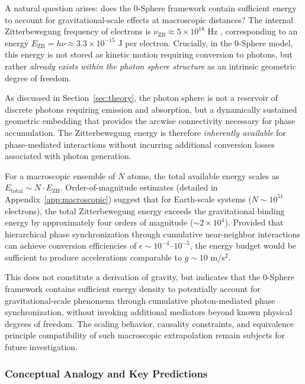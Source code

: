 \documentclass[
 reprint,
 amsmath,amssymb,
 aps,
 prb,
]{revtex4-2}
\numberwithin{equation}{section}
\begin{document}
A natural question arises: does the 0-Sphere framework contain sufficient energy to account for gravitational-scale effects at macroscopic distances? The internal Zitterbewegung frequency of electrons is $\nu_{\text{ZB}} \approx 5 \times 10^{18}$ Hz \cite{Hanamura2024spin}, corresponding to an energy $E_{\text{ZB}} = h\nu \approx 3.3 \times 10^{-15}$ J per electron. Crucially, in the 0-Sphere model, this energy is not stored as kinetic motion requiring conversion to photons, but rather \textit{already exists within the photon sphere structure} as an intrinsic geometric degree of freedom.

As discussed in Section~\ref{sec:theory}, the photon sphere is not a reservoir of discrete photons requiring emission and absorption, but a dynamically sustained geometric embedding that provides the arcwise connectivity necessary for phase accumulation. The Zitterbewegung energy is therefore \textit{inherently available} for phase-mediated interactions without incurring additional conversion losses associated with photon generation.

For a macroscopic ensemble of $N$ atoms, the total available energy scales as $E_{\text{total}} \sim N \cdot E_{\text{ZB}}$. Order-of-magnitude estimates (detailed in Appendix~\ref{app:macroscopic}) suggest that for Earth-scale systems ($N \sim 10^{51}$ electrons), the total Zitterbewegung energy exceeds the gravitational binding energy by approximately four orders of magnitude ($\sim 2 \times 10^4$). Provided that hierarchical phase synchronization through cumulative near-neighbor interactions can achieve conversion efficiencies of $\epsilon \sim 10^{-4}$--$10^{-5}$, the energy budget would be sufficient to produce accelerations comparable to $g \sim 10$ m/s$^2$.

This does not constitute a derivation of gravity, but indicates that the 0-Sphere framework contains sufficient energy density to potentially account for gravitational-scale phenomena through cumulative photon-mediated phase synchronization, without invoking additional mediators beyond known physical degrees of freedom. The scaling behavior, causality constraints, and equivalence principle compatibility of such macroscopic extrapolation remain subjects for future investigation.

\subsubsection{Conceptual Analogy and Key Predictions}
\end{document}
